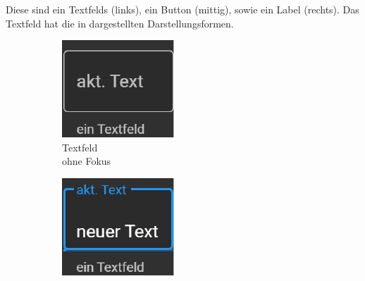Diese sind ein Textfelds (links), ein Button (mittig), sowie ein Label (rechts).
Das Textfeld hat die in  dargestellten Darstellungsformen.
\begin{figure}[ht]
  \centering
  \hspace{0.05\textwidth}
  \begin{subfigure}[h]{0.24\textwidth}
    \centering
    \includegraphics[width=\textwidth]{content/hauptteil/umsetzungPoC/frontend/res/TextfeldNoFokus.pdf}
    \caption{Textfeld \\ohne Fokus}
    \label{fig:frontend:poc:textFeld:noFocus}
  \end{subfigure}
  \hfill
  \begin{subfigure}[h]{0.24\textwidth}
    \centering
    \includegraphics[width=\textwidth]{content/hauptteil/umsetzungPoC/frontend/res/TextfeldFokus.pdf}

\end{subfigure}
\end{figure}
